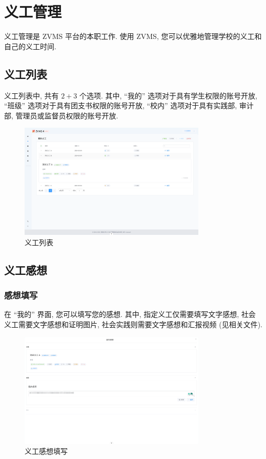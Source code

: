 \documentclass{article}
\begin{document}
\section{义工管理}

义工管理是 ZVMS 平台的本职工作. 使用 ZVMS, 您可以优雅地管理学校的义工和自己的义工时间.

\subsection{义工列表}

义工列表中, 共有 $2 + 3$ 个选项. 其中, ``我的'' 选项对于具有学生权限的账号开放, ``班级'' 选项对于具有团支书权限的账号开放, ``校内'' 选项对于具有实践部, 审计部, 管理员或监督员权限的账号开放.

\begin{figure}[H]
  \centering
  \includegraphics[width=0.8\textwidth]{../assets/image-20240303153534228.png}
  \caption{义工列表}
  \label{fig:volunteer-list}
\end{figure}

\subsection{义工感想}

\subsubsection{感想填写}

在 ``我的'' 界面, 您可以填写您的感想. 其中, 指定义工仅需要填写文字感想, 社会义工需要文字感想和证明图片, 社会实践则需要文字感想和汇报视频 (见相关文件).

\begin{figure}[H]
  \centering
  \includegraphics[width=0.8\textwidth]{../assets/image-20240303153939095.png}
  \caption{义工感想填写}
  \label{fig:volunteer-feelings}
\end{figure}
\end{document}

